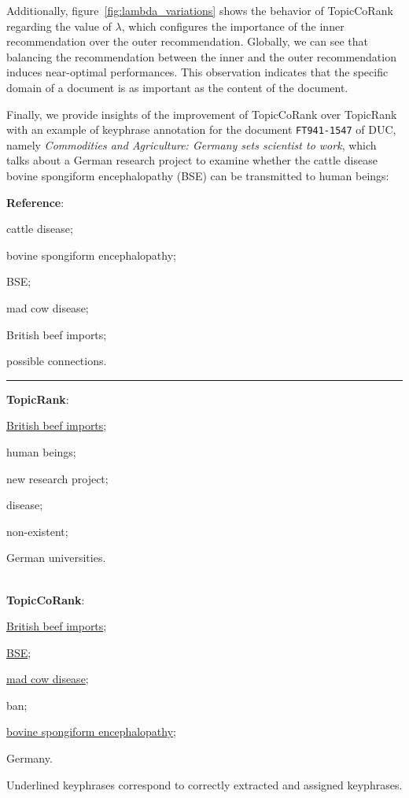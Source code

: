     Additionally, figure~\ref{fig:lambda_variations} shows the behavior of TopicCoRank
    regarding the value of $\lambda$, which configures the importance of the inner
    recommendation over the outer recommendation. Globally, we can see that balancing
    the recommendation between the inner and the outer recommendation induces
    near-optimal performances. This observation indicates that the specific domain of a
    document is as important as the content of the document.
    
    Finally, we provide insights of the improvement of TopicCoRank over TopicRank with
    an example of keyphrase annotation for the document \texttt{FT941-1547} of DUC, namely
    \textit{Commodities and Agriculture: Germany sets scientist to work}, which talks about
    a German research project to examine whether the cattle disease bovine spongiform
    encephalopathy (BSE) can be transmitted to human beings:
    \begin{center}
        \begin{varwidth}{.9\linewidth}
            \textbf{Reference}:
            \begin{enumerate*}
                \item{cattle disease;}
                \item{bovine spongiform encephalopathy;}
                \item{BSE;}
                \item{mad cow disease;}
                \item{British beef imports;}
                \item{possible connections.}
            \end{enumerate*}
            \noindent\rule[0.5ex]{\linewidth}{.5pt}
            \textbf{TopicRank}:
            \begin{enumerate*}
                \item{\underline{British beef imports};}
                \item{human beings;}
                \item{new research project;}
                \item{disease;}
                \item{non-existent;}
                \item{German universities.}
            \end{enumerate*}\\
            \textbf{TopicCoRank}:
            \begin{enumerate*}
                \item{\underline{British beef imports};}
                \item{\underline{BSE};}
                \item{\underline{mad cow disease};}
                \item{ban;}
                \item{\underline{bovine spongiform encephalopathy};}
                \item{Germany.}
            \end{enumerate*}
        \end{varwidth}
    \end{center}
    Underlined keyphrases correspond to correctly extracted and assigned keyphrases.
